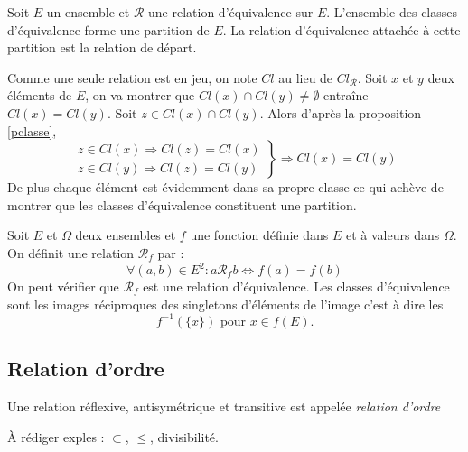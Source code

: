 \begin{propn}
 Soit $E$ un ensemble et $\mathcal R$ une relation d'équivalence sur $E$. L'ensemble des classes d'équivalence forme une partition de $E$. La relation d'équivalence attachée à cette partition est la relation de départ.
\end{propn}
\begin{demo}
Comme une seule relation est en jeu, on note $Cl$ au lieu de $Cl_\mathcal{R}$. Soit $x$ et $y$ deux éléments de $E$, on va montrer que $Cl(x)\cap Cl(y)\neq \emptyset$ entraîne $Cl(x)=Cl(y)$.\newline
Soit $z\in Cl(x)\cap Cl(y)$. Alors d'après la proposition \ref{pclasse}, 
\begin{displaymath}
  \left. 
  \begin{aligned}
    z\in Cl(x) \Rightarrow Cl(z)= Cl(x) \\ z\in Cl(y) \Rightarrow Cl(z)= Cl(y)  
  \end{aligned}
\right\rbrace \Rightarrow Cl(x) = Cl(y) 
\end{displaymath}
De plus chaque élément est évidemment dans sa propre classe ce qui achève de montrer que les classes d'équivalence constituent une partition.
\end{demo}


\begin{exple}
 Soit $E$ et $\Omega$ deux ensembles et $f$ une fonction définie dans $E$ et à valeurs dans $\Omega$. On définit une relation $\mathcal R_f$ par : 
\begin{displaymath}
 \forall (a,b)\in E^2 : a\mathcal R_f b \Leftrightarrow f(a)=f(b)
\end{displaymath}
On peut vérifier que $\mathcal R_f$ est une relation  d'équivalence. Les classes d'équivalence sont les images réciproques des singletons d'éléments de l'image c'est à dire les
\begin{displaymath}
 f^{-1}(\{x\})\text{ pour } x\in f(E).
\end{displaymath}
\end{exple}

\subsection{Relation d'ordre}
\begin{defi}
 Une relation réflexive, antisymétrique et transitive est appelée \emph{relation d'ordre}
\end{defi}
\begin{exples}
\`A rédiger exples : $\subset$, $\leq$, divisibilité.  
\end{exples}

